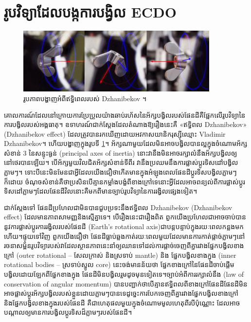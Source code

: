 \documentclass[10pt,twocolumn,letterpaper]{article}
\begin{document}
\section{រូបវិទ្យាដែលបង្កការបង្វិល ECDO}
\begin{figure}
\begin{center}
\includegraphics[width=0.9\textwidth]{dzhani.jpg}
\end{center}
   \caption{រូបភាពបង្ហាញអំពីឥទ្ធិពេលរបស់ Dzhanibekov \cite{28}។}
\label{fig:10}
\end{figure}

គោលការណ៍ដែលនៅក្រោយការប្រែប្រួលយ៉ាងឆាប់រហ័សនៃអ័ក្សបង្វិលរបស់ផែនដីគឺផ្អែកលើរូបវិទ្យានៃការបង្វិលរបស់អង្គធាតុ។ ឧទាហរណ៍ជាក់ស្តែងដែលតំណាងឱ្យរឿងនេះគឺ «ឥទ្ធិពល Dzhanibekov» (Dzhanibekov effect) ដែលត្រូវបានរកឃើញដោយអវកាសយានិករុស្ស៊ីឈ្មោះ Vladimir Dzhanibekov។ \cite{37} ហើយបង្ហាញក្នុងរូបទី \ref{fig:10}។ អ័ក្សណាមួយដែលមិនអាចបង្វិលបានល្អក្នុងចំណោមអ័ក្សសំខាន់ 3 នៃសន្ទុះធ្ងន់ (principal axes of inertia) នោះវានឹងមិនអាចរក្សាលំនឹងអ័ក្សបង្វិលឲ្យនៅថេរបានឡើយ។ បើអ័ក្សមួយវិលជិតអ័ក្សសំខាន់ទីពីរ វានឹងប្រឈមនឹងការផ្លាស់ប្តូរទិសដៅបង្វិលភ្លាមៗ។ ទោះបីនេះមិនមែនជាអ្វីដែលយើងជឿថាកើតមានក្នុងអំឡុងពេលផែនដីប្តូរទិសបង្វិលភ្លាមៗក៏ដោយ ចំណុចសំខាន់គឺថាប្រសិនបើគ្មានកម្លាំងបង្ខំពីខាងក្រៅទេនោះអ្វីដែលអាចពន្យល់ពីការផ្លាស់ប្តូរទិសដៅភ្លាមៗដែលផែនដីវិល​នោះគឺមកពីមានច្បាប់រូបវិទ្យានៃការរង្វិលផ្សេងទៀត។​

ជាក់ស្តែងទៅ ផែនដីប្រហែលជាមិនបានជួបប្រទះនឹងឥទ្ធិពល Dzhanibekov (Dzhanibekov effect) ដែលមានភាពសាមញ្ញនិងស្មើគ្នាទេ។ បើរឿងនេះជារឿងពិត ពួកយើងប្រហែលជាអាចចាប់បាននូវការផ្លាស់ប្តូរការរង្វិលរបស់ផែនដី (Earth’s rotational axis)ជាបន្តបន្ទាប់ក្នុងរយៈពេលកន្លងមកហើយ។ផ្ទុយទៅវិញ ពួកយើងជឿថា ផែនដីធ្លាប់ឆ្លងកាត់រយៈពេលមួយដែលមានការកាត់ផ្តាច់ភ្លាមៗនៅរចនាសម្ព័នរូបវិទ្យារបស់វា​ដែលស្ថានភាពនេះនាំឲ្យឈានទៅដល់ការផ្ដាច់ចេញពីគ្នារវាងផ្នែកបង្វិលខាងក្រៅ (outer rotational – សែលក្រាស់ និងស្រទាប់ mantle) និង ផ្នែកបង្វិលខាងក្នុង (inner rotational bodies – ស្រទាប់ស្នូល core) នេះចង់មានន័យថា ផ្នែកខាងក្រៅនៃផែនដីចាប់ផ្តើមបង្វិលដោយឡែកពីផ្នែកខាងក្នុង ផែនដីមិនបង្វិលរួមដូចមុនទៀតទេ។ច្បាប់អំពីការរក្សាលំនឹង (law of conservation of angular momentum) បានបញ្ជាក់ថា​បើគ្មានឥទ្ធិពលពីខាងក្រៅផែនដី​ផែនដីមិនអាចផ្លាស់ប្តូរអ័ក្សបង្វិលរបស់ខ្លួនដោយភ្លាមៗបានទេ​ដូច្នេះការបែកចេញពីគ្នារវាងផ្នែកបង្វិលខាងក្រៅ និងផ្នែកបង្វិលខាងក្នុងរបស់ផែនដី គឺជាហេតុផលមួយក្នុងចំណោមមូលហេតុពីរ​បីប៉ុណ្ណោះ ដែលអាចបណ្តាលឲ្យមានការបង្វិលប្តូរទិសដ៏ភ្លាមៗរបស់ផែនដី។
\end{document}
